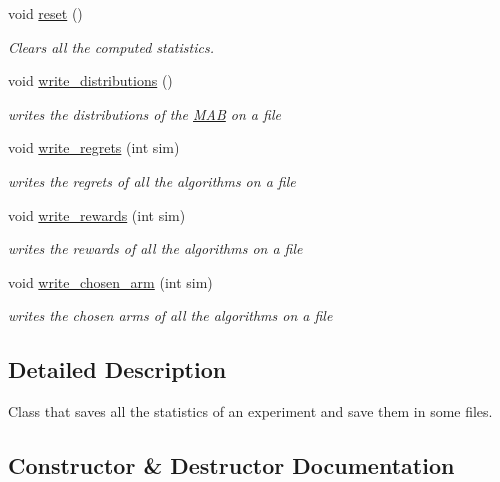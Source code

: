 \begin{DoxyCompactItemize}
void \mbox{\hyperlink{class_statistic_manager_a705cc1ab2a751e9a6bb33497ebd7dd8d}{reset}} ()
\begin{DoxyCompactList}\small\item\em Clears all the computed statistics. \end{DoxyCompactList}\item 
void \mbox{\hyperlink{class_statistic_manager_a854ffb38f78ef33ee4f4af303d5fdeb6}{write\+\_\+distributions}} ()
\begin{DoxyCompactList}\small\item\em writes the distributions of the \mbox{\hyperlink{class_m_a_b}{M\+AB}} on a file \end{DoxyCompactList}\item 
void \mbox{\hyperlink{class_statistic_manager_a860a072febcdfa51da4552982afa3353}{write\+\_\+regrets}} (int sim)
\begin{DoxyCompactList}\small\item\em writes the regrets of all the algorithms on a file \end{DoxyCompactList}\item 
void \mbox{\hyperlink{class_statistic_manager_afd9de41c65c706e3bec9bf0b76000f27}{write\+\_\+rewards}} (int sim)
\begin{DoxyCompactList}\small\item\em writes the rewards of all the algorithms on a file \end{DoxyCompactList}\item 
void \mbox{\hyperlink{class_statistic_manager_aca523fc6d8ee7d142e42887f2c51719d}{write\+\_\+chosen\+\_\+arm}} (int sim)
\begin{DoxyCompactList}\small\item\em writes the chosen arms of all the algorithms on a file \end{DoxyCompactList}\end{DoxyCompactItemize}


\subsection{Detailed Description}
Class that saves all the statistics of an experiment and save them in some files. 

\subsection{Constructor \& Destructor Documentation}
\mbox{\label{class_statistic_manager_a7791d6be8cb2cc1b61f7329e94c541dc}} 
